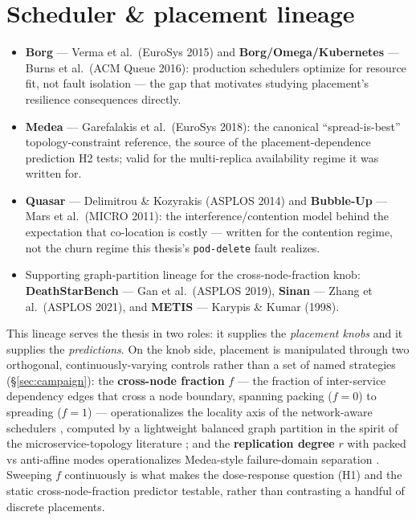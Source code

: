 \section{Scheduler \& placement lineage}\label{sec:scheduler-lineage}

\begin{itemize}
\item \textbf{Borg} --- Verma et al.\ (EuroSys 2015) and \textbf{Borg/Omega/Kubernetes}
  --- Burns et al.\ (ACM Queue 2016): production schedulers optimize for resource
  fit, not fault isolation --- the gap that motivates studying placement's
  resilience consequences directly.
\item \textbf{Medea} --- Garefalakis et al.\ (EuroSys 2018): the canonical
  ``spread-is-best'' topology-constraint reference, the source of the
  placement-dependence prediction H2 tests; valid for the multi-replica
  availability regime it was written for.
\item \textbf{Quasar} --- Delimitrou \& Kozyrakis (ASPLOS 2014) and \textbf{Bubble-Up}
  --- Mars et al.\ (MICRO 2011): the interference/contention model behind the
  expectation that co-location is costly --- written for the contention regime,
  not the churn regime this thesis's \texttt{pod-delete} fault realizes.
\item Supporting graph-partition lineage for the cross-node-fraction knob:
  \textbf{DeathStarBench} --- Gan et al.\ (ASPLOS 2019), \textbf{Sinan} --- Zhang et al.\
  (ASPLOS 2021), and \textbf{METIS} --- Karypis \& Kumar (1998).
\end{itemize}

This lineage serves the thesis in two roles: it supplies the \emph{placement
knobs} and it supplies the \emph{predictions}. On the knob side, placement is
manipulated through two orthogonal, continuously-varying controls rather than a
set of named strategies (\S\ref{sec:campaign}): the \textbf{cross-node fraction}
$f$ --- the fraction of inter-service dependency edges that cross a node boundary,
spanning packing ($f{=}0$) to spreading ($f{=}1$) --- operationalizes the
locality axis of the network-aware schedulers \citep{wojciechowski2021netmarks,
trade2024scheduling}, computed by a lightweight balanced graph partition in
the spirit of the microservice-topology literature \citep{gan2019deathstarbench,
zhang2021sinan,karypis1998metis}; and the \textbf{replication degree} $r$ with
packed vs anti-affine modes operationalizes Medea-style failure-domain
separation \citep{garefalakis2018medea}. Sweeping $f$ continuously is what makes
the dose-response question (H1) and the static cross-node-fraction predictor
testable, rather than contrasting a handful of discrete placements.

